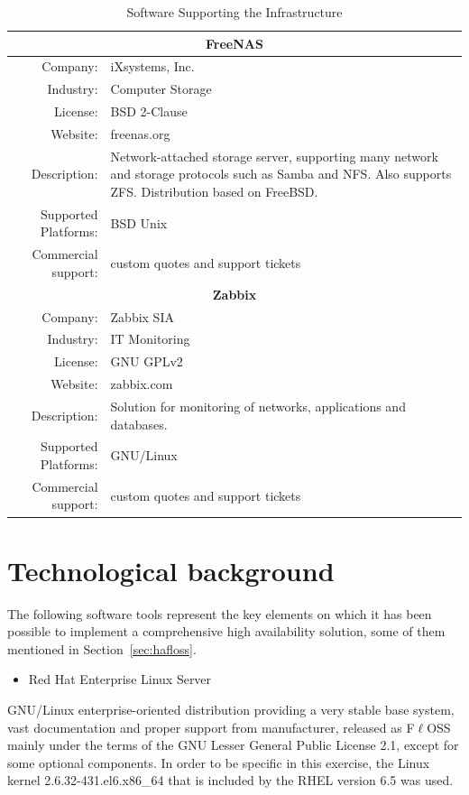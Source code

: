 \documentclass[a4paper, 12pt]{book}
\begin{document}
\begin{table}
\begin{tabular}{ | r m{10cm} | }
    \hline    
    \multicolumn{2}{|c|}{\textbf{FreeNAS}}\\
    \hline
    Company: & iXsystems, Inc. \\
    Industry: & Computer Storage \\
    License: & BSD 2-Clause \\
    Website: & freenas.org \\
    Description: & Network-attached storage server, supporting many network and storage protocols such as Samba and NFS. Also supports ZFS. Distribution based on FreeBSD. \\
    Supported Platforms: & BSD Unix \\
    Commercial support: & custom quotes and support tickets \\
    \hline
    \multicolumn{2}{|c|}{\textbf{Zabbix}}\\
    \hline
    Company: & Zabbix SIA \\
    Industry: & IT Monitoring \\
    License: & GNU GPLv2 \\
    Website: & zabbix.com \\
    Description: & Solution for monitoring of networks, applications and databases. \\
    Supported Platforms: & GNU/Linux \\
    Commercial support: & custom quotes and support tickets \\
    \hline
  \end{tabular}
\caption{Software Supporting the Infrastructure}
\label{table:technologies}
\end{table}


%
\chapter{Technological background}
\label{chap:implemented}

The following software tools represent the key elements on which it has been possible to implement a comprehensive high availability solution, some of them mentioned in Section~\ref{sec:hafloss}.

\begin{itemize}
	\item Red Hat Enterprise Linux Server
\end{itemize}

\noindent GNU/Linux enterprise-oriented distribution providing a very stable base system, vast documentation and proper support from manufacturer, released as F$\ell$OSS mainly under the terms of the GNU Lesser General Public License 2.1, except for some optional components. In order to be specific in this exercise, the Linux kernel 2.6.32-431.el6.x86\_64 that is included by the RHEL version 6.5 was used.
\end{document}
